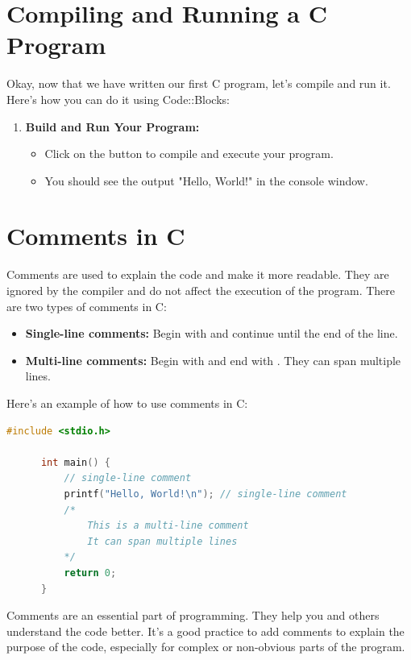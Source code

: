 \documentclass[12pt, openany]{book}
\begin{document}
  \section{Compiling and Running a C Program}
  Okay, now that we have written our first C program, let's compile and run it. Here's how you can do it using Code::Blocks:
  \begin{enumerate}
      \item \textbf{Build and Run Your Program:}
      \begin{itemize}
          \item Click on the  button to compile and execute your program.
          \item You should see the output "Hello, World!" in the console window.
      \end{itemize}
  \end{enumerate}
  
  \section{Comments in C}
  Comments are used to explain the code and make it more readable. They are ignored by the compiler and do not affect the execution of the program. There are two types of comments in C:
  \begin{itemize}
      \item \textbf{Single-line comments:} Begin with \ui{//} and continue until the end of the line.
      \item \textbf{Multi-line comments:} Begin with \ui{/*} and end with \ui{*/}. They can span multiple lines.
  \end{itemize}
  \clearpage
  Here's an example of how to use comments in C:
  \begin{lstlisting}[language=C, caption=Using Comments in C]
      #include <stdio.h>
      
      int main() {
          // single-line comment
          printf("Hello, World!\n"); // single-line comment
          /*
              This is a multi-line comment
              It can span multiple lines
          */
          return 0;
      }
  \end{lstlisting}
  \begin{infobox}
      Comments are an essential part of programming. They help you and others understand the code better. It's a good practice to add comments to explain the purpose of the code, especially for complex or non-obvious parts of the program.
  \end{infobox}
  
\end{document}
